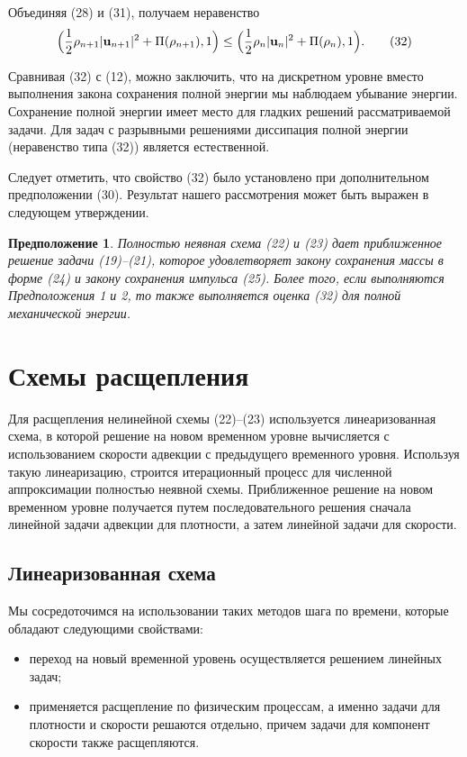 \documentclass[10pt,twocolumn]{article}
\newtheorem{proposition}{Предположение}
\begin{document}
Объединяя (28) и (31), получаем неравенство
\begin{equation}
\Bigl(\frac{1}{2}\rho_{n + 1}|\mathbf{u}_{n + 1}|^2 + \Pi(\rho_{n + 1}), 1\Bigr) \leq \Bigl(\frac{1}{2}\rho_{n}|\mathbf{u}_{n}|^2 + \Pi(\rho_{n}), 1\Bigr). \tag{32}
\end{equation}

Сравнивая (32) с (12), можно заключить, что на дискретном уровне вместо выполнения закона сохранения полной энергии мы наблюдаем убывание энергии. Сохранение полной энергии имеет место для гладких решений рассматриваемой задачи. Для задач с разрывными решениями диссипация полной энергии (неравенство типа (32)) является естественной.

Следует отметить, что свойство (32) было установлено при дополнительном предположении (30). Результат нашего рассмотрения может быть выражен в следующем утверждении.

\begin{proposition}
Полностью неявная схема (22) и (23) дает приближенное решение задачи (19)--(21), которое удовлетворяет закону сохранения массы в форме (24) и закону сохранения импульса (25). Более того, если выполняются Предположения 1 и 2, то также выполняется оценка (32) для полной механической энергии.
\end{proposition}

\section{Схемы расщепления}

Для расщепления нелинейной схемы (22)--(23) используется линеаризованная схема, в которой решение на новом временном уровне вычисляется с использованием скорости адвекции с предыдущего временного уровня. Используя такую линеаризацию, строится итерационный процесс для численной аппроксимации полностью неявной схемы. Приближенное решение на новом временном уровне получается путем последовательного решения сначала линейной задачи адвекции для плотности, а затем линейной задачи для скорости.

\subsection{Линеаризованная схема}

Мы сосредоточимся на использовании таких методов шага по времени, которые обладают следующими свойствами:
\begin{itemize}
    \item переход на новый временной уровень осуществляется решением линейных задач;
    \item применяется расщепление по физическим процессам, а именно задачи для плотности и скорости решаются отдельно, причем задачи для компонент скорости также расщепляются.
\end{itemize}
\end{document}
